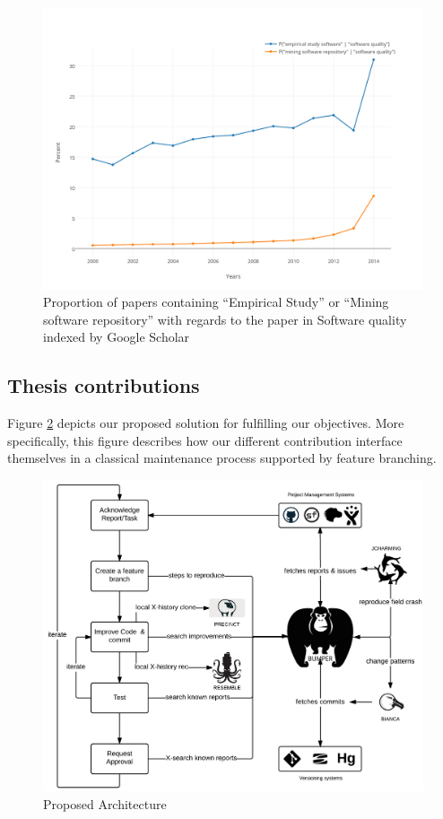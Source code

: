\begin{itemize}
	\begin{figure}[h!]
	  \centering
	  	    \includegraphics[scale=0.7]{media/scholar.png}
	    \caption{Proportion of papers containing ``Empirical Study'' or ``Mining software repository'' with regards to the paper in Software quality indexed by Google Scholar	\label{fig:scholar}}
	\end{figure}

\end{itemize}

\subsection{Thesis contributions\label{sec:objective-thesis}}

Figure \ref{fig:proposal} depicts our proposed solution for fulfilling our objectives.
More specifically, this figure describes how our different contribution interface themselves in a classical maintenance process supported by feature branching.

\begin{figure}[h!]
	\centering
	\includegraphics[scale=0.25]{media/proposal.png}
	\caption{Proposed Architecture}
	\label{fig:proposal}
\end{figure}

